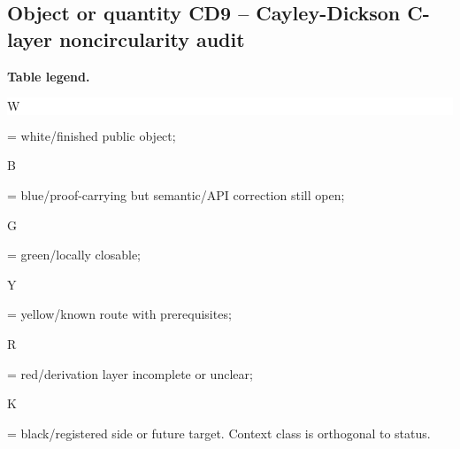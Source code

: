 \subsection*{Object or quantity CD9 -- Cayley-Dickson C-layer noncircularity audit}
\hypertarget{objproof:CD9}{}
\par\smallskip\noindent\begin{minipage}{0.99\linewidth}\footnotesize\raggedright\textbf{Table legend.} \colorbox{white}{\strut W} = white/finished public object; \colorbox{cyan!20}{\strut B} = blue/proof-carrying but semantic/API correction still open; \colorbox{green!18}{\strut G} = green/locally closable; \colorbox{yellow!25}{\strut Y} = yellow/known route with prerequisites; \colorbox{red!20}{\strut R} = red/derivation layer incomplete or unclear; \colorbox{black!18}{\strut K} = black/registered side or future target. Context class is orthogonal to status.\end{minipage}\par\vspace{0.25em}
